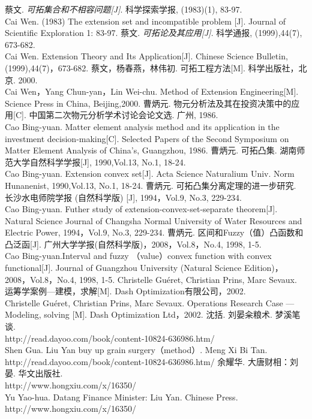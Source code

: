 \begin{thebibliography}{99}
蔡文. \emph{可拓集合和不相容问题[J]}. 科学探索学报, (1983)(1), 83-97.\\Cai Wen. (1983) The extension set and incompatible problem [J]. Journal of Scientific Exploration 1: 83-97.
蔡文. \emph{可拓论及其应用[J]}. 科学通报, (1999),44(7), 673-682.\\Cai Wen. Extension Theory and Its Application[J]. Chinese Science Bulletin, (1999),44(7)，673-682.
蔡文，杨春燕，林伟初. 可拓工程方法[M]. 科学出版社，北京. 2000.\\
Cai Wen，Yang Chun-yan，Lin Wei-chu. Method of Extension Engineering[M]. Science Press in China, Beijing,2000.
曹炳元. 物元分析法及其在投资决策中的应用[C]. 中国第二次物元分析学术讨论会论文选. 广州, 1986.\\
   Cao Bing-yuan. Matter element analysis method and its application in the investment decision-making[C]. Selected Papers of the Second Symposium on Matter Element Analysis of China's, Guangzhou, 1986.
曹炳元. 可拓凸集. 湖南师范大学自然科学学报[J], 1990,Vol.13,  No.1, 18-24.\\
Cao Bing-yuan. Extension convex set[J]. Acta Science Naturalium Univ. Norm Hunanenist, 1990,Vol.13, No.1, 18-24.
曹炳元. 可拓凸集分离定理的进一步研究. 长沙水电师院学报 (自然科学版) [J], 1994，Vol.9, No.3, 229-234.\\
   Cao Bing-yuan. Futher study of extension-convex-set-separate theorem[J]. Natural Science Journal of Changsha Normal University of Water Resources and Electric Power, 1994，Vol.9, No.3, 229-234.
曹炳元. 区间和Fuzzy（值）凸函数和凸泛函[J]. 广州大学学报(自然科学版)，2008，Vol.8，No.4, 1998, 1-5.\\
   Cao Bing-yuan.Interval and fuzzy （value）convex function with convex functional[J]. Journal of Guangzhou University (Natural Science Edition)，2008，Vol.8，No.4, 1998, 1-5.
Christelle Guéret, Christian Prins, Marc Sevaux. 运筹学案例---建模，求解[M]. Dash Optimization有限公司，2002.\\
   Christelle Guéret, Christian Prins, Marc Sevaux. Operations Research Case --- Modeling, solving [M]. Dash Optimization Ltd，2002.
沈括. 刘晏籴粮术. 梦溪笔谈. \\http://read.dayoo.com/book/content-10824-636986.htm/\\
   Shen Gua. Liu Yan buy up grain surgery（method）. Meng Xi Bi Tan. \\ http://read.dayoo.com/book/content-10824-636986.htm/
余耀华. 大唐财相：刘晏. 华文出版社. \\http://www.hongxiu.com/x/16350/\\
Yu Yao-hua. Datang Finance Minister: Liu Yan. Chinese Press. \\http://www.hongxiu.com/x/16350/
\end{thebibliography}
